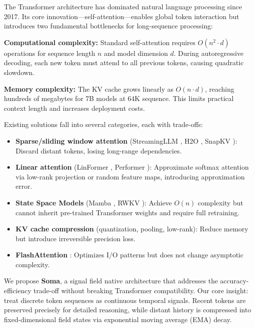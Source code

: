 \documentclass[11pt]{article}
\begin{document}
The Transformer architecture \citep{vaswani2017attention} has dominated natural language processing since 2017. Its core innovation---self-attention---enables global token interaction but introduces two fundamental bottlenecks for long-sequence processing:

\textbf{Computational complexity:} Standard self-attention requires $O(n^2 \cdot d)$ operations for sequence length $n$ and model dimension $d$. During autoregressive decoding, each new token must attend to all previous tokens, causing quadratic slowdown.

\textbf{Memory complexity:} The KV cache grows linearly as $O(n \cdot d)$, reaching hundreds of megabytes for 7B models at 64K sequence. This limits practical context length and increases deployment costs.

Existing solutions fall into several categories, each with trade-offs:

\begin{itemize}
    \item \textbf{Sparse/sliding window attention} (StreamingLLM \citep{xiao2024streamingllm}, H2O \citep{zhang2023h2o}, SnapKV \citep{li2024snapkv}): Discard distant tokens, losing long-range dependencies.
    \item \textbf{Linear attention} (LinFormer \citep{wang2021linformer}, Performer \citep{choromanski2021performer}): Approximate softmax attention via low-rank projection or random feature maps, introducing approximation error.
    \item \textbf{State Space Models} (Mamba \citep{gu2024mamba}, RWKV \citep{zhou2023rwkv}): Achieve $O(n)$ complexity but cannot inherit pre-trained Transformer weights and require full retraining.
    \item \textbf{KV cache compression} (quantization, pooling, low-rank): Reduce memory but introduce irreversible precision loss.
    \item \textbf{FlashAttention} \citep{dao2022flashattention, dao2024flashattention2}: Optimizes I/O patterns but does not change asymptotic complexity.
\end{itemize}

We propose \textbf{Soma}, a signal field native architecture that addresses the accuracy-efficiency trade-off without breaking Transformer compatibility. Our core insight: treat discrete token sequences as continuous temporal signals. Recent tokens are preserved precisely for detailed reasoning, while distant history is compressed into fixed-dimensional field states via exponential moving average (EMA) decay.
\end{document}
